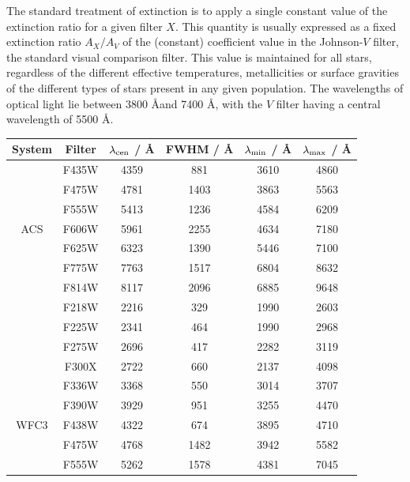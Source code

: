 \documentclass[12pt, a4paper]{report}
\begin{document}
The standard treatment of extinction is to apply a single constant value of the extinction ratio for a given filter $X$. This quantity is usually expressed as a fixed extinction ratio $A_{X}/A_{V}$ of the (constant) coefficient value in the Johnson-$V$ filter, the standard visual comparison filter. This value is maintained for all stars, regardless of the different effective temperatures, metallicities or surface gravities of the different types of stars present in any given population. The wavelengths of optical light lie between 3800 \AA and 7400 \AA, with the $V$ filter having a central wavelength of 5500 \AA.

\begin{table}
\begin{center}
\begin{tabular}{cccccc}
\hline
System & Filter & $\lambda_{\textnormal{cen}}$ / \AA & FWHM / \AA & $\lambda_{\textnormal{min}}$ / \AA & $\lambda_{\textnormal{max}}$ / \AA \\
\hline
& F435W & 4359 & 881 & 3610 & 4860 \\ %
& F475W & 4781 & 1403 & 3863 & 5563 \\ %
& F555W & 5413 & 1236 & 4584 & 6209 \\ %
ACS & F606W & 5961 & 2255 & 4634 & 7180 \\ %
& F625W & 6323 & 1390 & 5446 & 7100 \\ %
& F775W & 7763 & 1517 & 6804 & 8632 \\ %
& F814W & 8117 & 2096 & 6885 & 9648 \\ %
\hline
& F218W & 2216 & 329 & 1990 & 2603 \\ %
& F225W & 2341 & 464 & 1990 & 2968 \\ %
& F275W & 2696 & 417 & 2282 & 3119 \\ %
& F300X & 2722 & 660 & 2137 & 4098 \\ %
& F336W & 3368 & 550 & 3014 & 3707 \\ %
& F390W & 3929 & 951 & 3255 & 4470 \\ %
WFC3 & F438W & 4322 & 674 & 3895 & 4710 \\ %
& F475W & 4768 & 1482 & 3942 & 5582 \\ %
& F555W & 5262 & 1578 & 4381 & 7045 \\ %

\end{tabular}
\end{center}
\end{table}
\end{document}

